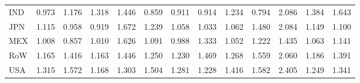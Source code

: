 \begin{table}[htbp]
\begin{tabular}{lcccccccccccc}
  IND & \textcolor[RGB]{221,143,34}{0.973} & \textcolor[RGB]{140,91,115}{1.176} & \textcolor[RGB]{85,55,170}{1.318} & \textcolor[RGB]{59,38,196}{1.446} & \textcolor[RGB]{244,158,11}{0.859} & \textcolor[RGB]{240,155,15}{0.911} & \textcolor[RGB]{234,151,21}{0.914} & \textcolor[RGB]{119,77,136}{1.234} & \textcolor[RGB]{251,162,4}{0.794} & \textcolor[RGB]{4,3,251}{2.086} & \textcolor[RGB]{74,48,181}{1.384} & \textcolor[RGB]{25,16,230}{1.643} \\ 
  JPN & \textcolor[RGB]{172,111,83}{1.115} & \textcolor[RGB]{223,144,32}{0.958} & \textcolor[RGB]{232,150,23}{0.919} & \textcolor[RGB]{23,15,232}{1.672} & \textcolor[RGB]{117,76,138}{1.239} & \textcolor[RGB]{198,128,57}{1.058} & \textcolor[RGB]{206,133,49}{1.033} & \textcolor[RGB]{195,126,60}{1.062} & \textcolor[RGB]{49,32,206}{1.480} & \textcolor[RGB]{6,4,249}{2.084} & \textcolor[RGB]{157,102,98}{1.149} & \textcolor[RGB]{176,114,79}{1.100} \\ 
  MEX & \textcolor[RGB]{212,138,42}{1.008} & \textcolor[RGB]{246,160,8}{0.857} & \textcolor[RGB]{210,136,45}{1.010} & \textcolor[RGB]{28,18,227}{1.626} & \textcolor[RGB]{178,115,76}{1.091} & \textcolor[RGB]{217,140,38}{0.988} & \textcolor[RGB]{81,52,174}{1.333} & \textcolor[RGB]{200,129,55}{1.052} & \textcolor[RGB]{130,84,125}{1.222} & \textcolor[RGB]{64,41,191}{1.435} & \textcolor[RGB]{193,125,62}{1.063} & \textcolor[RGB]{164,106,91}{1.141} \\ 
  RoW & \textcolor[RGB]{153,99,102}{1.165} & \textcolor[RGB]{66,43,189}{1.416} & \textcolor[RGB]{155,100,100}{1.163} & \textcolor[RGB]{62,40,193}{1.446} & \textcolor[RGB]{104,67,151}{1.250} & \textcolor[RGB]{121,78,134}{1.230} & \textcolor[RGB]{55,36,200}{1.469} & \textcolor[RGB]{100,65,155}{1.268} & \textcolor[RGB]{36,23,219}{1.559} & \textcolor[RGB]{8,5,246}{2.060} & \textcolor[RGB]{136,88,119}{1.186} & \textcolor[RGB]{72,47,183}{1.391} \\ 
  USA & \textcolor[RGB]{87,56,168}{1.315} & \textcolor[RGB]{32,21,223}{1.572} & \textcolor[RGB]{149,96,106}{1.168} & \textcolor[RGB]{94,61,162}{1.303} & \textcolor[RGB]{45,29,210}{1.504} & \textcolor[RGB]{96,62,159}{1.281} & \textcolor[RGB]{123,80,132}{1.228} & \textcolor[RGB]{68,44,187}{1.416} & \textcolor[RGB]{30,19,225}{1.582} & \textcolor[RGB]{0,0,255}{2.405} & \textcolor[RGB]{108,70,147}{1.249} & \textcolor[RGB]{79,51,176}{1.341} \\ 
   \hline
\end{tabular}
\end{table}
